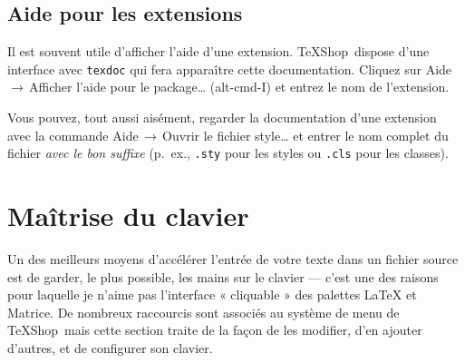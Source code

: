 \documentclass[11pt,french]{article}
\newcommand{\TS}{\textsf{\TeX Shop}}
\newcommand{\cmd}[1]{\textsf{#1}}
\newcommand{\mnu}[1]{\textsf{#1}}
\newcommand{\To}{\,\(\to\)\,}
\begin{document}

\subsection{Aide pour les extensions} 

Il est souvent utile d'afficher l'aide d'une extension. \TS\ dispose d'une interface avec \texttt{texdoc} qui fera apparaître cette documentation. Cliquez sur \mnu{Aide}\To\mnu{Afficher l'aide pour le package…} (\cmd{alt-cmd-I}) et entrez le nom de l'extension.

Vous pouvez, tout aussi aisément, regarder la documentation d'une extension avec la commande \mnu{Aide}\To\mnu{Ouvrir le fichier style…} et entrer le nom complet du fichier \emph{avec le bon suffixe} (p.~ex., \texttt{.sty} pour les styles ou \texttt{.cls} pour les classes).

%


\section{Maîtrise du clavier} 

Un des meilleurs moyens d'accélérer l'entrée de votre texte dans un fichier source est de garder, le plus possible, les mains sur le clavier --- c'est une des raisons pour laquelle je n'aime pas l'interface « cliquable » des palettes LaTeX et Matrice. De nombreux raccourcis sont associés au système de menu de \TS\ mais cette section traite de la façon de les modifier, d'en ajouter d'autres, et de configurer son clavier.
\end{document}
